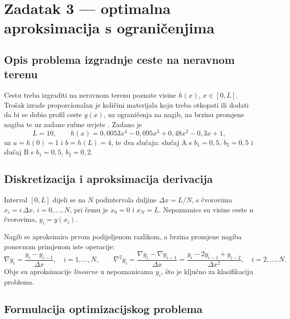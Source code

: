 
\section{Zadatak 3 --- optimalna aproksimacija s ograničenjima}
\label{sec:zad3}

\subsection{Opis problema izgradnje ceste na neravnom terenu}
\label{sec:zad3:opis}

Cestu treba izgraditi na neravnom terenu poznate visine $h(x)$, $x \in [0, L]$.
Trošak izrade proporcionalan je količini materijala koju treba otkopati ili
dodati da bi se dobio profil ceste $y(x)$, uz ograničenja na nagib, na brzinu
promjene nagiba te uz zadane rubne uvjete \cite[str.~1]{jokic_zadatak}. Zadano je
\begin{equation}
  L = 10, \qquad h(x) = 0{,}0053x^4 - 0{,}095x^3 + 0{,}48x^2 - 0{,}3x + 1,
\end{equation}
uz $a = h(0) = 1$ i $b = h(L) = 4$, te dva slučaja:
slučaj A s $b_1 = 0{,}5$, $b_2 = 0{,}5$ i slučaj B s $b_1 = 0{,}5$, $b_2 = 0{,}2$.

\subsection{Diskretizacija i aproksimacija derivacija}
\label{sec:zad3:diskretizacija}

Interval $[0,L]$ dijeli se na $N$ podintervala duljine $\Delta x = L/N$, s
čvorovima $x_i = i\,\Delta x$, $i = 0,\dots,N$, pri čemu je $x_0 = 0$ i $x_N = L$.
Nepoznanice su visine ceste u čvorovima, $y_i = y(x_i)$.

Nagib se aproksimira prvom podijeljenom razlikom, a brzina promjene nagiba
ponovnom primjenom iste operacije:
\begin{equation}
  \nabla y_i = \frac{y_i - y_{i-1}}{\Delta x},\quad i = 1,\dots,N, \qquad
  \nabla^2 y_i = \frac{\nabla y_i - \nabla y_{i-1}}{\Delta x}
               = \frac{y_i - 2y_{i-1} + y_{i-2}}{\Delta x^2},\quad i = 2,\dots,N .
  \label{eq:z3diff}
\end{equation}
Obje su aproksimacije \emph{linearne} u nepoznanicama $y_i$, što je ključno za
klasifikaciju problema.

\subsection{Formulacija optimizacijskog problema}
\label{sec:zad3:formulacija}

